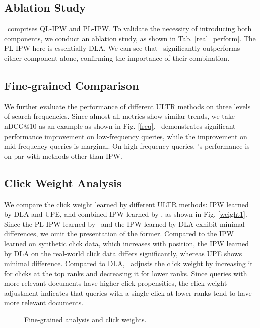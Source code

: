 \subsection{Ablation Study}
\m~comprises QL-IPW and PL-IPW. To validate the necessity of introducing both components, we conduct an ablation study, as shown in Tab. \ref{real_perform}. The PL-IPW here is essentially DLA. We can see that \m~significantly outperforms either component alone, confirming the importance of their combination.

\subsection{Fine-grained Comparison}
We further evaluate the performance of different ULTR methods on three levels of search frequencies. Since almost all metrics show similar trends, we take nDCG@10 as an example as shown in Fig. \ref{freq}. \m~demonstrates significant performance improvement on low-frequency queries, while the improvement on mid-frequency queries is marginal. On high-frequency queries, \m's performance is on par with methods other than IPW.


\subsection{Click Weight Analysis}
We compare the click weight learned by different ULTR methods: IPW learned by DLA and UPE, and combined IPW learned by \m, as shown in Fig. \ref{weight1}. Since the PL-IPW learned by \m~and the IPW learned by DLA exhibit minimal differences, we omit the presentation of the former. Compared to the IPW learned on synthetic click data, which increases with position, the IPW learned by DLA on the real-world click data differs significantly, whereas UPE shows minimal difference. Compared to DLA, \m~adjusts the click weight by increasing it for clicks at the top ranks and decreasing it for lower ranks. Since queries with more relevant documents have higher click propensities, the click weight adjustment indicates that queries with a single click at lower ranks tend to have more relevant documents.

\begin{figure}[!t]
\centering
{}
\caption{Fine-grained analysis and click weights.}
\end{figure}

